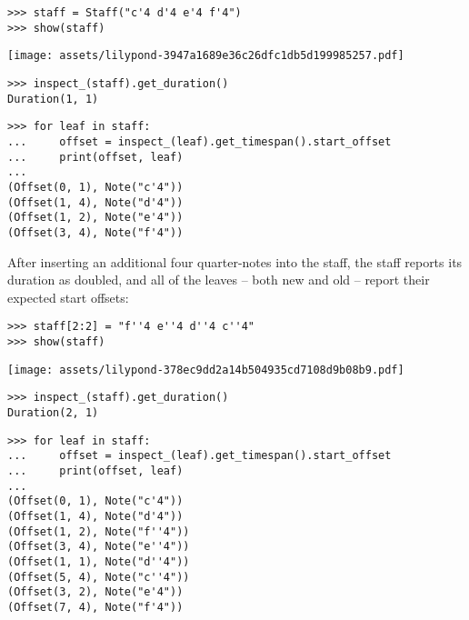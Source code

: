 \begin{abjadbookoutput}
\begin{singlespacing}
\vspace{-0.5\baselineskip}
\begin{lstlisting}
>>> staff = Staff("c'4 d'4 e'4 f'4")
>>> show(staff)
\end{lstlisting}
\noindent\texttt{[image: assets/lilypond-3947a1689e36c26dfc1db5d199985257.pdf]}
\begin{lstlisting}
>>> inspect_(staff).get_duration()
Duration(1, 1)
\end{lstlisting}
\begin{lstlisting}
>>> for leaf in staff:
...     offset = inspect_(leaf).get_timespan().start_offset
...     print(offset, leaf)
...
(Offset(0, 1), Note("c'4"))
(Offset(1, 4), Note("d'4"))
(Offset(1, 2), Note("e'4"))
(Offset(3, 4), Note("f'4"))
\end{lstlisting}
\end{singlespacing}
\end{abjadbookoutput}

\noindent After inserting an additional four quarter-notes into the staff, the
staff reports its duration as doubled, and all of the leaves -- both new and
old -- report their expected start offsets:

\begin{comment}
<abjad>
staff[2:2] = "f''4 e''4 d''4 c''4"
show(staff)
inspect_(staff).get_duration()
for leaf in staff:
    offset = inspect_(leaf).get_timespan().start_offset
    print(offset, leaf)

</abjad>
\end{comment}

\begin{abjadbookoutput}
\begin{singlespacing}
\vspace{-0.5\baselineskip}
\begin{lstlisting}
>>> staff[2:2] = "f''4 e''4 d''4 c''4"
>>> show(staff)
\end{lstlisting}
\noindent\texttt{[image: assets/lilypond-378ec9dd2a14b504935cd7108d9b08b9.pdf]}
\begin{lstlisting}
>>> inspect_(staff).get_duration()
Duration(2, 1)
\end{lstlisting}
\begin{lstlisting}
>>> for leaf in staff:
...     offset = inspect_(leaf).get_timespan().start_offset
...     print(offset, leaf)
...
(Offset(0, 1), Note("c'4"))
(Offset(1, 4), Note("d'4"))
(Offset(1, 2), Note("f''4"))
(Offset(3, 4), Note("e''4"))
(Offset(1, 1), Note("d''4"))
(Offset(5, 4), Note("c''4"))
(Offset(3, 2), Note("e'4"))
(Offset(7, 4), Note("f'4"))
\end{lstlisting}
\end{singlespacing}
\end{abjadbookoutput}

